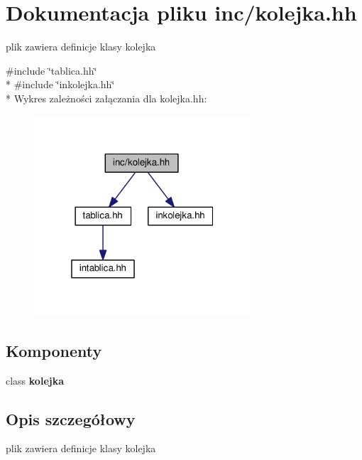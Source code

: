\section{Dokumentacja pliku inc/kolejka.hh}
\label{kolejka_8hh}


plik zawiera definicje klasy kolejka  


{\ttfamily \#include \char`\"{}tablica.\+hh\char`\"{}}\\*
{\ttfamily \#include \char`\"{}inkolejka.\+hh\char`\"{}}\\*
Wykres zależności załączania dla kolejka.\+hh\+:
\nopagebreak
\begin{figure}[H]
\begin{center}
\leavevmode
\includegraphics[width=229pt]{kolejka_8hh__incl}
\end{center}
\end{figure}
\subsection*{Komponenty}
\begin{DoxyCompactItemize}
\item 
class {\bf kolejka}
\end{DoxyCompactItemize}


\subsection{Opis szczegółowy}
plik zawiera definicje klasy kolejka 

